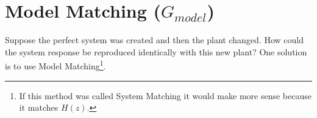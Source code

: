 \documentclass{article}
\begin{document}


\clearpage
\section{Model Matching ($G_{model}$)}
\label{sec:mm}

%
%
%
%
%
%
%

Suppose the perfect system was created and then the plant changed.
How could the system response be reproduced identically with this new plant?
One solution is to use Model Matching\footnote{If this method was called
System Matching it would make more sense because it matches $H(z)$.}.
\end{document}
